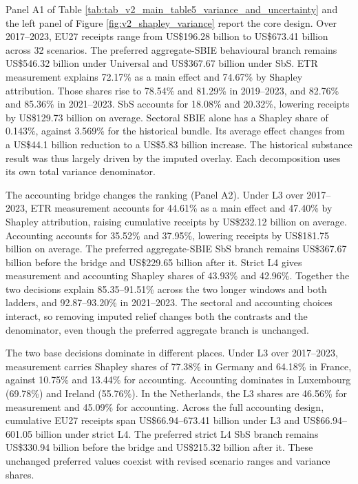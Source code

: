 \documentclass[11pt,a4paper]{article}
\newcommand{\usd}{US\$}
\begin{document}
Panel A1 of Table \ref{tab:tab_v2_main_table5_variance_and_uncertainty} and the left panel of Figure \ref{fig:v2_shapley_variance} report the core design. Over 2017–2023, EU27 receipts range from \usd196.28 billion to \usd673.41 billion across 32 scenarios. The preferred aggregate-SBIE behavioural branch remains \usd546.32 billion under Universal and \usd367.67 billion under SbS. ETR measurement explains 72.17\% as a main effect and 74.67\% by Shapley attribution. Those shares rise to 78.54\% and 81.29\% in 2019–2023, and 82.76\% and 85.36\% in 2021–2023. SbS accounts for 18.08\% and 20.32\%, lowering receipts by \usd129.73 billion on average. Sectoral SBIE alone has a Shapley share of 0.143\%, against 3.569\% for the historical bundle. Its average effect changes from a \usd44.1 billion reduction to a \usd5.83 billion increase. The historical substance result was thus largely driven by the imputed overlay. Each decomposition uses its own total variance denominator.

The accounting bridge changes the ranking (Panel A2). Under L3 over 2017–2023, ETR measurement accounts for 44.61\% as a main effect and 47.40\% by Shapley attribution, raising cumulative receipts by \usd232.12 billion on average. Accounting accounts for 35.52\% and 37.95\%, lowering receipts by \usd181.75 billion on average. The preferred aggregate-SBIE SbS branch remains \usd367.67 billion before the bridge and \usd229.65 billion after it. Strict L4 gives measurement and accounting Shapley shares of 43.93\% and 42.96\%. Together the two decisions explain 85.35–91.51\% across the two longer windows and both ladders, and 92.87–93.20\% in 2021–2023. The sectoral and accounting choices interact, so removing imputed relief changes both the contrasts and the denominator, even though the preferred aggregate branch is unchanged.

The two base decisions dominate in different places. Under L3 over 2017–2023, measurement carries Shapley shares of 77.38\% in Germany and 64.18\% in France, against 10.75\% and 13.44\% for accounting. Accounting dominates in Luxembourg (69.78\%) and Ireland (55.76\%). In the Netherlands, the L3 shares are 46.56\% for measurement and 45.09\% for accounting. Across the full accounting design, cumulative EU27 receipts span \usd66.94–673.41 billion under L3 and \usd66.94–601.05 billion under strict L4. The preferred strict L4 SbS branch remains \usd330.94 billion before the bridge and \usd215.32 billion after it. These unchanged preferred values coexist with revised scenario ranges and variance shares.
\end{document}
